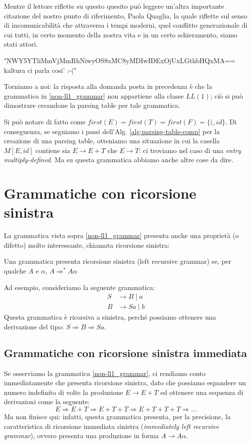 \documentclass[class=book, crop=false, oneside, 12pt]{standalone}
\begin{document}
Mentre il lettore riflette su questo quesito può leggere un'altra importante citazione del nostro punto di riferimento, Paola Quaglia, la quale riflette sul senso di incomunicabilità che attraversa i tempi moderni, quel conflitto generazionale di cui tutti, in certo momento della nostra vita e in un certo schieramento, siamo stati attori.
\begin{displayquote}
    "NWY5YTliMmVjMmRhNiwyOS8xMC8yMDIwIDExOjUxLGthbHQxMA==  kaltura ci parla cosi' :-("
\end{displayquote}
Torniamo a noi: la risposta alla domanda posta in precedenza è che la grammatica in \ref{non-ll1_grammar} non appartiene alla classe \(LL(1)\); ciò si può dimostrare creandone la parsing table per tale grammatica.

Si può notare di fatto come \(first(E) = first(T) = first(F) = \{(, id\}\).
Di conseguenza, se seguiamo i passi dell'Alg. \ref{alg:parsing-table-comp} per la creazione di una parsing table, otteniamo una situazione in cui la casella \(M[E, id]\) contiene sia \(E \to E+T\) che \(E \to T\): ci troviamo nel caso di una \emph{entry multiply-defined}. Ma su questa grammatica abbiamo anche altre cose da dire.

\section{Grammatiche con ricorsione sinistra}
La grammatica vista sopra \ref{non-ll1_grammar} presenta anche una proprietà (o difetto) molto interessante, chiamata ricorsione sinistra:
\begin{definition}
    Una grammatica presenta ricorsione sinistra (left recursive grammar) se, per qualche \(A\) e \(\alpha\), \(A \Rightarrow^* A\alpha\)
\end{definition}

Ad esempio, consideriamo la seguente grammatica:
\begin{align*}
    S &\to B \mid a \\
    B &\to Sa \mid b
\end{align*}
Questa grammatica è ricorsiva a sinistra, perché possiamo ottenere una derivazione del tipo: \(S \Rightarrow B \Rightarrow Sa\).

\subsection{Grammatiche con ricorsione sinistra immediata}
Se osserviamo la grammatica \ref{non-ll1_grammar}, ci rendiamo conto immediatamente che presenta ricorsione sinistra, dato che possiamo espandere un numero indefinito di volte la produzione \(E \to E+T\) ed ottenere una sequenza di derivazioni come la seguente:
\begin{equation*}
    E \Rightarrow E+T \Rightarrow E+T+T \Rightarrow E+T+T+T \Rightarrow \dots
\end{equation*}
Ma non finisce qui: infatti, questa grammatica presenta, per la precisione, la caratteristica di ricorsione immediata sinistra (\emph{immediately left recursive grammar}), ovvero presenta una produzione in forma \(A \to A\alpha\).
\end{document}
